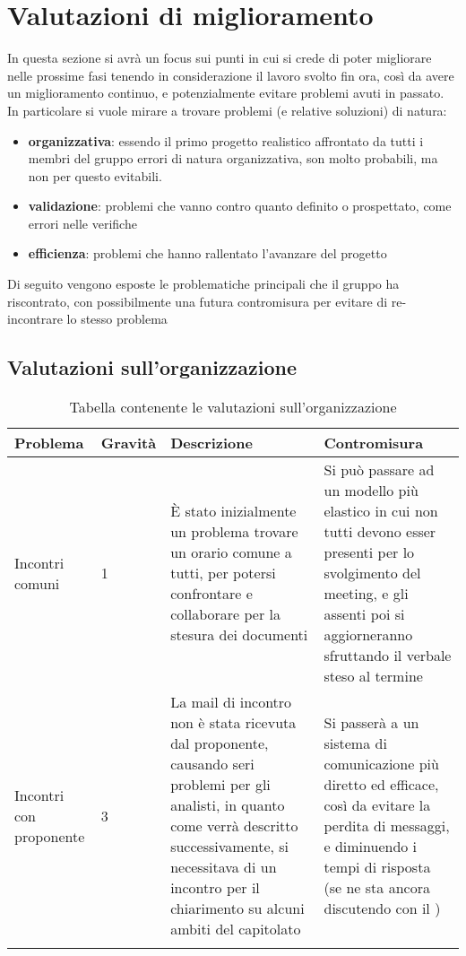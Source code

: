\appendix
{}
\section{Valutazioni di miglioramento}
	In questa sezione si avrà un focus sui punti in cui si crede di poter migliorare nelle prossime fasi tenendo in considerazione il lavoro svolto fin ora, così da avere un miglioramento continuo, e potenzialmente evitare problemi avuti in passato.
	In particolare si vuole mirare a trovare problemi (e relative soluzioni) di natura:
	\begin{itemize}	
		\item\textbf{organizzativa}: essendo il primo progetto realistico affrontato da tutti i membri del gruppo errori di natura organizzativa, son molto probabili, ma non per questo evitabili.
		\item\textbf{validazione}: problemi che vanno contro quanto definito o prospettato, come errori nelle verifiche
		\item\textbf{efficienza}: problemi che hanno rallentato l'avanzare del progetto
	\end{itemize}
	Di seguito vengono esposte le problematiche principali che il gruppo ha riscontrato, con possibilmente una futura contromisura per evitare di re-incontrare lo stesso problema
	
	
	\subsection{Valutazioni sull'organizzazione}
		\begin{center}
			\begin{longtable}{|p{3cm}|p{1.5cm}|p{4cm}|p{4cm}|}
			\hline
			\rowcolor{lighter-grayer}
			\textbf{Problema} &  \textbf{Gravità} &  \textbf{Descrizione} & \textbf{Contromisura}\\
			\hline
			\endfirsthead
			\hline
			Incontri comuni
			&
			1
			&
			È stato inizialmente un problema trovare un orario comune a tutti, per potersi confrontare e collaborare per la stesura dei documenti
	  		&
			Si può passare ad un modello più elastico in cui non tutti devono esser presenti per lo svolgimento del meeting, e gli assenti poi si aggiorneranno sfruttando il verbale steso al termine \\
			\hline
			
			Incontri con proponente
			&
			3
			&
			La mail di incontro non è stata ricevuta dal proponente, causando seri problemi per gli analisti, in quanto come verrà descritto successivamente, si necessitava di un incontro per il chiarimento su alcuni ambiti del capitolato
	  		&
			Si passerà a un sistema di comunicazione più diretto ed efficace, così da evitare la perdita di messaggi, e diminuendo i tempi di risposta (se ne sta ancora discutendo con il \glock{proponente}) \\
			\hline
			
			
			
			\rowcolor{white}
			\caption{Tabella contenente le valutazioni sull'organizzazione}
			\end{longtable}
		\end{center}

